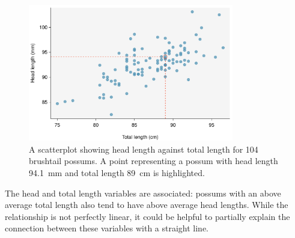 \begin{figure}[h]
   \centering
   \includegraphics[width=0.8\textwidth]{ch_regr_simple_linear/figures/scattHeadLTotalL/scattHeadLTotalL}

   \caption{A scatterplot showing head length against total length for 104 brushtail possums. A point representing a possum with head length 94.1~mm and total length 89~cm is highlighted.}
   \label{scattHeadLTotalL}
\end{figure}

\D{\newpage}

The head and total length variables are associated: possums with an above average total length also tend to have above average head lengths. While the relationship is not perfectly linear, it could be helpful to partially explain the connection between these variables with a straight line.





